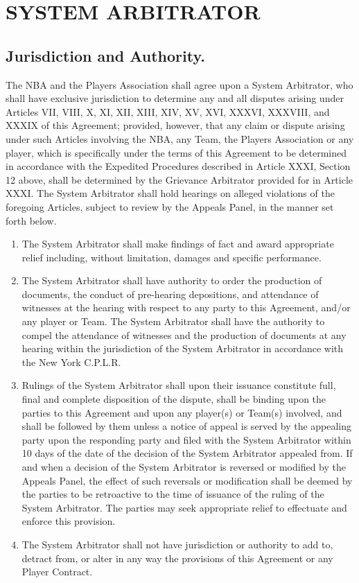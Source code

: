 \documentclass[
]{book}
\providecommand{\tightlist}{%
  \setlength{\itemsep}{0pt}\setlength{\parskip}{0pt}}
\begin{document}
\hypertarget{system-arbitrator}{%
\chapter{SYSTEM ARBITRATOR}\label{system-arbitrator}}

\hypertarget{jurisdiction-and-authority.}{%
\section{Jurisdiction and Authority.}\label{jurisdiction-and-authority.}}

The NBA and the Players Association shall agree upon a System Arbitrator, who shall have exclusive jurisdiction to determine any and all disputes arising under Articles VII, VIII, X, XI, XII, XIII, XIV, XV, XVI, XXXVI, XXXVIII, and XXXIX of this Agreement; provided, however, that any claim or dispute arising under such Articles involving the NBA, any Team, the Players Association or any player, which is specifically under the terms of this Agreement to be determined in accordance with the Expedited Procedures described in Article XXXI, Section 12 above, shall be determined by the Grievance Arbitrator provided for in Article XXXI. The System Arbitrator shall hold hearings on alleged violations of the foregoing Articles, subject to review by the Appeals Panel, in the manner set forth below.

\begin{enumerate}
\def\labelenumi{(\alph{enumi})}
\tightlist
\item
  The System Arbitrator shall make findings of fact and award appropriate relief including, without limitation, damages and specific performance.
\item
  The System Arbitrator shall have authority to order the production of documents, the conduct of pre-hearing depositions, and attendance of witnesses at the hearing with respect to any party to this Agreement, and/or any player or Team. The System Arbitrator shall have the authority to compel the attendance of witnesses and the production of documents at any hearing within the jurisdiction of the System Arbitrator in accordance with the New York C.P.L.R.
\item
  Rulings of the System Arbitrator shall upon their issuance constitute full, final and complete disposition of the dispute, shall be binding upon the parties to this Agreement and upon any player(s) or Team(s) involved, and shall be followed by them unless a notice of appeal is served by the appealing party upon the responding party and filed with the System Arbitrator within 10 days of the date of the decision of the System Arbitrator appealed from. If and when a decision of the System Arbitrator is reversed or modified by the Appeals Panel, the effect of such reversals or modification shall be deemed by the parties to be retroactive to the time of issuance of the ruling of the System Arbitrator. The parties may seek appropriate relief to effectuate and enforce this provision.
\item
  The System Arbitrator shall not have jurisdiction or authority to add to, detract from, or alter in any way the provisions of this Agreement or any Player Contract.
\end{enumerate}
\end{document}
